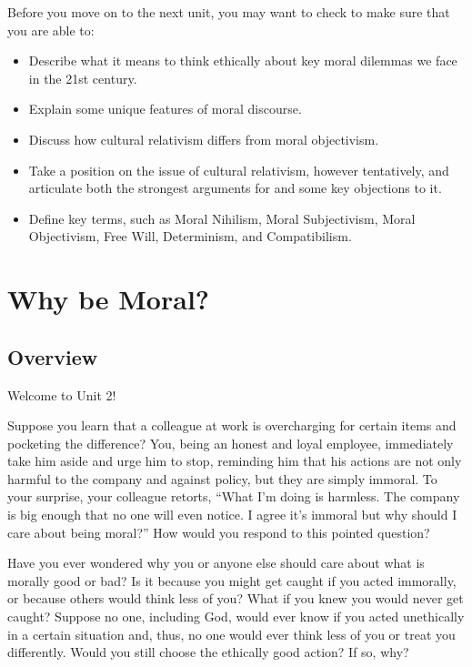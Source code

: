 \documentclass[
]{book}
\providecommand{\tightlist}{%
  \setlength{\itemsep}{0pt}\setlength{\parskip}{0pt}}
\begin{document}
\begin{progress}
Before you move on to the next unit, you may want to check to make sure that you are able to:

\begin{itemize}
\tightlist
\item
  Describe what it means to think ethically about key moral dilemmas we face in the 21st century.
\item
  Explain some unique features of moral discourse.
\item
  Discuss how cultural relativism differs from moral objectivism.
\item
  Take a position on the issue of cultural relativism, however tentatively, and articulate both the strongest arguments for and some key objections to it.
\item
  Define key terms, such as Moral Nihilism, Moral Subjectivism, Moral Objectivism, Free Will, Determinism, and Compatibilism.
\end{itemize}
\end{progress}

\hypertarget{why-be-moral}{%
\chapter{Why be Moral?}\label{why-be-moral}}

\hypertarget{overview-1}{%
\section*{Overview}\label{overview-1}}

Welcome to Unit 2!

Suppose you learn that a colleague at work is overcharging for certain items and pocketing the difference? You, being an honest and loyal employee, immediately take him aside and urge him to stop, reminding him that his actions are not only harmful to the company and against policy, but they are simply immoral. To your surprise, your colleague retorts, ``What I'm doing is harmless. The company is big enough that no one will even notice. I agree it's immoral but why should I care about being moral?'' How would you respond to this pointed question?

Have you ever wondered why you or anyone else should care about what is morally good or bad? Is it because you might get caught if you acted immorally, or because others would think less of you? What if you knew you would never get caught? Suppose no one, including God, would ever know if you acted unethically in a certain situation and, thus, no one would ever think less of you or treat you differently. Would you still choose the ethically good action? If so, why?
\end{document}
